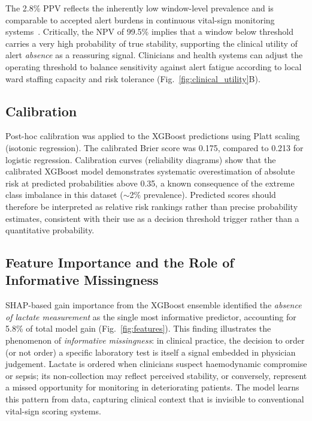\documentclass[12pt]{article}
\begin{document}
The 2.8\% PPV reflects the inherently low window-level prevalence and is
comparable to accepted alert burdens in continuous vital-sign monitoring
systems~\cite{drew2014}. Critically, the NPV of 99.5\% implies that a window
below threshold carries a very high probability of true stability, supporting
the clinical utility of alert \emph{absence} as a reassuring signal.
Clinicians and health systems can adjust the operating threshold to balance
sensitivity against alert fatigue according to local ward staffing capacity
and risk tolerance (Fig.~\ref{fig:clinical_utility}B).

\subsection*{Calibration}

Post-hoc calibration was applied to the XGBoost predictions using Platt
scaling (isotonic regression). The calibrated Brier score was 0.175, compared
to 0.213 for logistic regression. Calibration curves (reliability diagrams)
show that the calibrated XGBoost model demonstrates systematic overestimation
of absolute risk at predicted probabilities above 0.35, a known consequence of
the extreme class imbalance in this dataset ($\sim$2\% prevalence). Predicted
scores should therefore be interpreted as relative risk rankings rather than
precise probability estimates, consistent with their use as a decision
threshold trigger rather than a quantitative probability.

\subsection*{Feature Importance and the Role of Informative Missingness}

SHAP-based gain importance from the XGBoost ensemble identified the
\emph{absence of lactate measurement} as the single most informative
predictor, accounting for 5.8\% of total model gain (Fig.~\ref{fig:features}).
This finding illustrates the phenomenon of \emph{informative missingness}: in
clinical practice, the decision to order (or not order) a specific laboratory
test is itself a signal embedded in physician judgement. Lactate is ordered
when clinicians suspect haemodynamic compromise or sepsis; its non-collection
may reflect perceived stability, or conversely, represent a missed opportunity
for monitoring in deteriorating patients. The model learns this pattern from
data, capturing clinical context that is invisible to conventional vital-sign
scoring systems.
\end{document}
